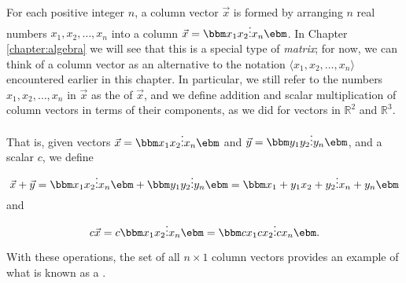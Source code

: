 For each positive integer $n$, a column vector $\vec{x}$ is formed by arranging $n$ real numbers $x_1, x_2, \ldots, x_n$ into a column $\vec{x} = \bbm x_1\\x_2\\\vdots \\x_n\ebm$. In Chapter \ref{chapter:algebra} we will see that this is a special type of \textit{matrix}; for now, we can think of a column vector as an alternative to the notation $\langle x_1,x_2,\ldots, x_n\rangle$ encountered earlier in this chapter. In particular, we still refer to the numbers $x_1,x_2,\ldots, x_n$ in $\vec{x}$ as the  of $\vec{x}$, and we define addition and scalar multiplication of column vectors in terms of their components, as we did for vectors in $\mathbb{R}^2$ and $\mathbb{R}^3$. 

That is, given vectors $\vec{x} = \bbm x_1\\x_2\\\vdots\\x_n\ebm$ and $\vec{y} = \bbm y_1\\y_2\\\vdots \\y_n\ebm$, and a scalar $c$, we define
\[
\vec{x}+\vec{y} = \bbm x_1\\x_2\\\vdots\\x_n\ebm + \bbm y_1\\y_2\\\vdots \\y_n\ebm = \bbm x_1+y_1\\x_2+y_2\\\vdots \\x_n+y_n\ebm
\]
and
\[
c\vec{x} = c\bbm x_1\\x_2\\\vdots\\x_n\ebm = \bbm cx_1\\cx_2\\\vdots\\cx_n\ebm.
\]

With these operations, the set of all $n\times 1$ column vectors provides an example of what is known as a . 




